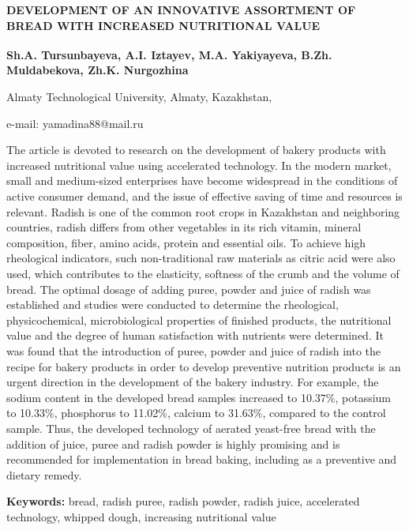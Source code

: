 \begin{articleheader}
{\bfseries DEVELOPMENT OF AN INNOVATIVE ASSORTMENT OF BREAD WITH INCREASED
NUTRITIONAL VALUE}

{\bfseries
Sh.A. Tursunbayeva,
A.I. Iztayev,
M.A. Yakiyayeva\textsuperscript{\envelope },
B.Zh. Muldabekova,
Zh.K. Nurgozhina
}
\end{articleheader}

\begin{affiliation}
Almaty Technological University, Almaty, Kazakhstan,

e-mail: yamadina88@mail.ru
\end{affiliation}

The article is devoted to research on the development of bakery products
with increased nutritional value using accelerated technology. In the
modern market, small and medium-sized enterprises have become widespread
in the conditions of active consumer demand, and the issue of effective
saving of time and resources is relevant. Radish is one of the common
root crops in Kazakhstan and neighboring countries, radish differs from
other vegetables in its rich vitamin, mineral composition, fiber, amino
acids, protein and essential oils. To achieve high rheological
indicators, such non-traditional raw materials as citric acid were also
used, which contributes to the elasticity, softness of the crumb and the
volume of bread. The optimal dosage of adding puree, powder and juice of
radish was established and studies were conducted to determine the
rheological, physicochemical, microbiological properties of finished
products, the nutritional value and the degree of human satisfaction
with nutrients were determined. It was found that the introduction of
puree, powder and juice of radish into the recipe for bakery products in
order to develop preventive nutrition products is an urgent direction in
the development of the bakery industry. For example, the sodium content
in the developed bread samples increased to 10.37\%, potassium to
10.33\%, phosphorus to 11.02\%, calcium to 31.63\%, compared to the
control sample. Thus, the developed technology of aerated yeast-free
bread with the addition of juice, puree and radish powder is highly
promising and is recommended for implementation in bread baking,
including as a preventive and dietary remedy.

{\bfseries Keywords:} bread, radish puree, radish powder, radish juice,
accelerated technology, whipped dough, increasing nutritional value

